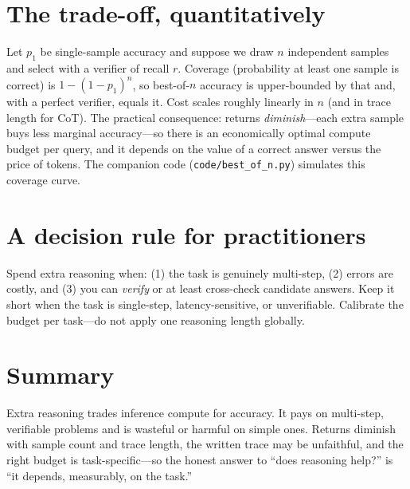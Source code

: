 \documentclass[11pt]{article}
\begin{document}
\section{The trade-off, quantitatively}
Let $p_1$ be single-sample accuracy and suppose we draw $n$ independent samples and select with a
verifier of recall $r$. Coverage (probability at least one sample is correct) is
$1-(1-p_1)^n$, so best-of-$n$ accuracy is upper-bounded by that and, with a perfect verifier, equals it.
Cost scales roughly linearly in $n$ (and in trace length for CoT). The practical consequence: returns
\emph{diminish}---each extra sample buys less marginal accuracy---so there is an economically optimal
compute budget per query, and it depends on the value of a correct answer versus the price of tokens.
The companion code (\texttt{code/best\_of\_n.py}) simulates this coverage curve.

\section{A decision rule for practitioners}
Spend extra reasoning when: (1) the task is genuinely multi-step, (2) errors are costly, and (3) you can
\emph{verify} or at least cross-check candidate answers. Keep it short when the task is single-step,
latency-sensitive, or unverifiable. Calibrate the budget per task---do not apply one reasoning length
globally.

\section{Summary}
Extra reasoning trades inference compute for accuracy. It pays on multi-step, verifiable problems and
is wasteful or harmful on simple ones. Returns diminish with sample count and trace length, the written
trace may be unfaithful, and the right budget is task-specific---so the honest answer to ``does
reasoning help?'' is ``it depends, measurably, on the task.''



\end{document}
